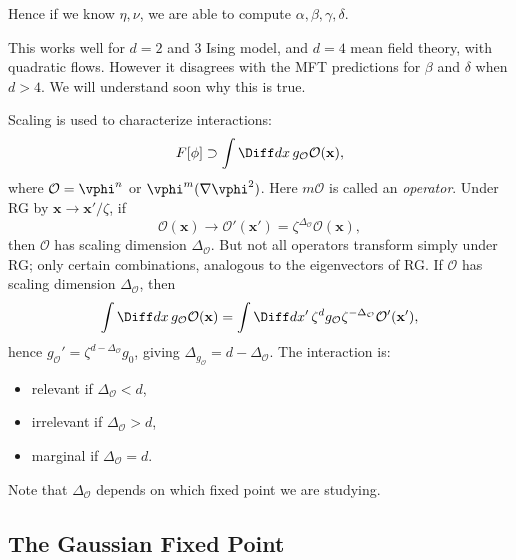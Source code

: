 \documentclass[12pt]{article}
\begin{document}
Hence if we know $\eta, \nu$, we are able to compute $\alpha, \beta, \gamma, \delta$.

This works well for $d = 2$ and $3$ Ising model, and $d = 4$ mean field theory, with quadratic flows. However it disagrees with the MFT predictions for $\beta$ and $\delta$ when $d > 4$. We will understand soon why this is true.


Scaling is used to characterize interactions:
\[
	F[\phi] \supset \int \Diff d x \, g_{\mathcal{O}} \mathcal{O}(\mathbf{x}),
\]
where $\mathcal{O} = \vphi^{n}$ or $\vphi^{m}(\nabla \vphi^2)$. Here $m\mathcal{O}$ is called an \emph{operator}. Under RG by $\mathbf{x} \to \mathbf{x}'/\zeta$, if
\[
\mathcal{O}(\mathbf{x}) \to \mathcal{O}'(\mathbf{x}') = \zeta^{\Delta_{\mathcal{O}}} \mathcal{O}(\mathbf{x}),
\]
then $\mathcal{O}$ has scaling dimension $\Delta_{\mathcal{O}}$. But not all operators transform simply under RG; only certain combinations, analogous to the eigenvectors of RG. If $\mathcal{O}$ has scaling dimension $\Delta_{\mathcal{O}}$, then
\[
\int \Diff d x\, g_{\mathcal{O}} \mathcal{O}(\mathbf{x}) = \int \Diff d x' \, \zeta^{d} g_{\mathcal{O}} \zeta^{-\Delta_{\mathcal{O}}} \mathcal{O}'(\mathbf{x}'),
\]
hence $g_{\mathcal{O}}' = \zeta^{d - \Delta_{\mathcal{O}}} g_0$, giving $\Delta_{g_{\mathcal{O}}} = d - \Delta_{\mathcal{O}}$. The interaction is:
\begin{itemize}
	\item relevant if $\Delta_{\mathcal{O}} < d$,
	\item irrelevant if $\Delta_{\mathcal{O}} > d$,
	\item marginal if $\Delta_{\mathcal{O}} = d$.
\end{itemize}

Note that $\Delta_{\mathcal{O}}$ depends on which fixed point we are studying.

\subsection{The Gaussian Fixed Point}%
\label{sub:gfp}
\end{document}
